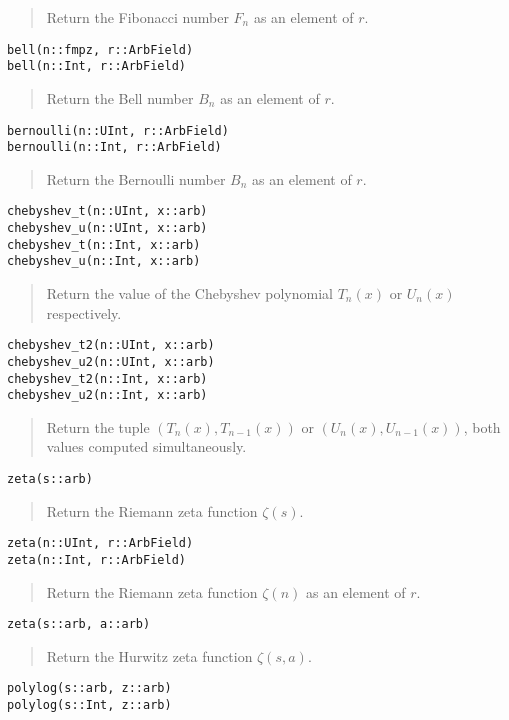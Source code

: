 \documentclass[a4paper,10pt]{article}
\newcommand{\desc}[1]{\vspace{-3mm}\begin{quote}#1\end{quote}}
\begin{document}
{{\desc{Return the Fibonacci number $F_n$ as an element of $r$.}

\begin{lstlisting}
bell(n::fmpz, r::ArbField)
bell(n::Int, r::ArbField)
\end{lstlisting}

\desc{Return the Bell number $B_n$ as an element of $r$.}

\begin{lstlisting}
bernoulli(n::UInt, r::ArbField)
bernoulli(n::Int, r::ArbField)
\end{lstlisting}

\desc{Return the Bernoulli number $B_n$ as an element of $r$.}

\begin{lstlisting}
chebyshev_t(n::UInt, x::arb)
chebyshev_u(n::UInt, x::arb)
chebyshev_t(n::Int, x::arb)
chebyshev_u(n::Int, x::arb)
\end{lstlisting}

\desc{Return the value of the Chebyshev polynomial $T_n(x)$ or $U_n(x)$ respectively.}

\begin{lstlisting}
chebyshev_t2(n::UInt, x::arb)
chebyshev_u2(n::UInt, x::arb)
chebyshev_t2(n::Int, x::arb)
chebyshev_u2(n::Int, x::arb)
\end{lstlisting}

\desc{Return the tuple $(T_{n}(x), T_{n-1}(x))$ or $(U_{n}(x), U_{n-1}(x))$,
both values computed simultaneously.}

\begin{lstlisting}
zeta(s::arb)
\end{lstlisting}

\desc{Return the Riemann zeta function $\zeta(s)$.}

\begin{lstlisting}
zeta(n::UInt, r::ArbField)
zeta(n::Int, r::ArbField)
\end{lstlisting}

\desc{Return the Riemann zeta function $\zeta(n)$ as an element of $r$.}

\begin{lstlisting}
zeta(s::arb, a::arb)
\end{lstlisting}

\desc{Return the Hurwitz zeta function $\zeta(s,a)$.}

\begin{lstlisting}
polylog(s::arb, z::arb)
polylog(s::Int, z::arb)
\end{lstlisting}

}}
\end{document}
